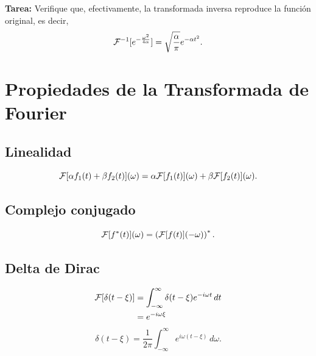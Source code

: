 \textbf{Tarea:} Verifique que, efectivamente, la transformada inversa reproduce la función original, es decir,
\begin{equation}\label{Tfinvgauss}
{\cal F}^{-1}[e^{-\frac{\omega^2}{4\alpha}}]=\sqrt{\frac{\alpha}{\pi}}e^{-\alpha t^2}.
\end{equation}

\section{Propiedades de la Transformada de Fourier} 
\subsection{Linealidad}
\begin{equation}
{\cal F}[\alpha f_1(t)+\beta f_2(t)](\omega) = \alpha{\cal F}[f_1(t)](\omega)+\beta {\cal F}[f_2(t)](\omega).
\end{equation}
\subsection{Complejo conjugado}
\begin{equation}
{\cal F}[f^\ast(t)](\omega) = \left({\cal F}[f(t)](-\omega)\right)^\ast.
\end{equation}

\subsection{Delta de Dirac}
\begin{align}
{\cal F}[\delta(t-\xi)] 
 &=\int_{-\infty}^\infty\delta(t-\xi) e^{-i\omega t}\,dt 
\\
 &=e^{-i\omega\xi} \label{Fd}
\end{align}
\begin{equation}
\boxed{ 
\delta(t-\xi) =\frac{1}{2\pi}\int_{-\infty}^\infty e^{i\omega (t-\xi)}\,d\omega. 
 }
\end{equation}
%
